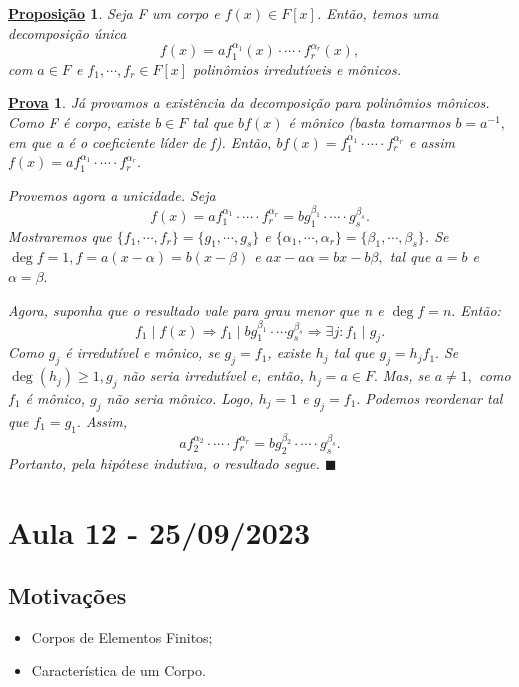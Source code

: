 \documentclass{article}
\newtheorem*{prop*}{\underline{Proposi\c c\~ao}}
\newtheorem*{proof*}{\underline{Prova}}
\renewcommand\qedsymbol{$\blacksquare$}
\begin{document}
\begin{prop*}
  Seja F um corpo e \(f(x)\in F[x]\). Então, temos uma decomposição única 
  \[
    f(x) = af_{1}^{\alpha_{1}}(x)\cdot \cdots \cdot f_{r}^{\alpha_{r}}(x),
  \]
  com \(a\in F\) e \(f_{1}, \cdots, f_{r}\in F[x]\) polinômios irredutíveis e mônicos.
\end{prop*}
\begin{proof*}
  Já provamos a existência da decomposição para polinômios mônicos. Como F é corpo, existe \(b\in F\) tal que 
  \(bf(x)\) é mônico (basta tomarmos \(b=a^{-1},\) em que a é o coeficiente líder de f). Então, \(bf(x) = f_{1}^{\alpha_{1}}\cdot \cdots \cdot f_{r}^{\alpha_{r}}\)
  e assim \(f(x) =af_{1}^{\alpha_{1}}\cdot \cdots \cdot f_{r}^{\alpha_{r}}.\)

  Provemos agora a unicidade. Seja 
  \[
    f(x)=af_{1}^{\alpha_{1}} \cdot \cdots \cdot f_{r}^{\alpha_{r}} = bg_{1}^{\beta_{1}} \cdot \cdots \cdot g_{s}^{\beta_{s}}.
  \]
  Mostraremos que \(\{f_{1}, \cdots, f_{r}\} = \{g_{1}, \cdots, g_{s}\}\) e \(\{\alpha_{1}, \cdots, \alpha_{r}\} = \{\beta_{1}, \cdots, \beta_{s}\}\).
  Se \(\deg{f} = 1, f = a(x-\alpha ) = b(x-\beta )\) e \(ax -a\alpha =bx - b\beta,\) tal que \(a=b\) e \(\alpha =\beta .\)

  Agora, suponha que o resultado vale para grau menor que n e \(\deg{f} = n.\) Então: 
  \[
    f_{1}\mid f(x) \Rightarrow f_{1}\mid bg_{1}^{\beta_{1}}\cdot \cdots g_{s}^{\beta_{s}} \Rightarrow \exists j: f_{1}\mid g_{j}.
  \]
  Como \(g_{j}\) é irredutível e mônico, se \(g_{j}=f_{1}\), existe \(h_{j}\) tal que \(g_{j} = h_{j}f_{1}.\) Se \(\deg{(h_{j})}\geq 1, g_{j}\) não seria
  irredutível e, então, \(h_{j} = a\in F.\) Mas, se \(a\neq1,\) como \(f_{1}\) é mônico, \(g_{j}\) não seria mônico. Logo, \(h_{j} = 1\) e \(g_{j} = f_{1}.\) 
  Podemos reordenar tal que \(f_{1} = g_{1}. \) Assim, 
  \[
    af_{2}^{\alpha_{2}}\cdot \cdots \cdot f_{r}^{\alpha_{r}} = bg_{2}^{\beta_{2}} \cdot \cdots \cdot g_{s}^{\beta_{s}}.
  \]
  Portanto, pela hipótese indutiva, o resultado segue. \qedsymbol
\end{proof*}
\newpage

\section{Aula 12 - 25/09/2023}
\subsection{Motivações}
\begin{itemize}
  \item Corpos de Elementos Finitos;
  \item Característica de um Corpo.
\end{itemize}
\end{document}
